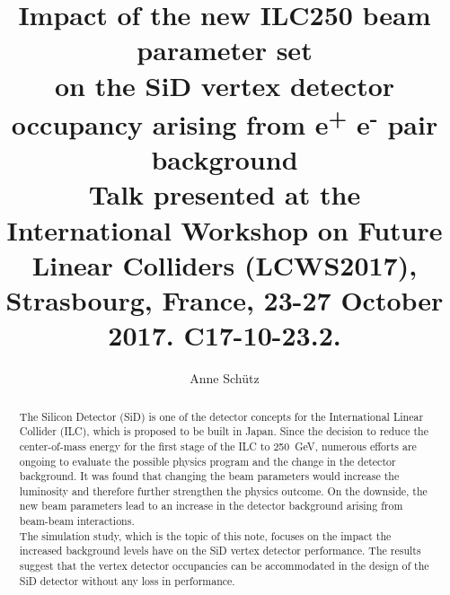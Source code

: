 \documentclass[12pt]{article}
\newcommand{\sid}{SiD\xspace}
\newcommand{\electron}{e\textsuperscript{-}\xspace}
\newcommand{\positron}{e\textsuperscript{+}\xspace}
\begin{document}

\title{Impact of the new ILC250 beam parameter set\\on the \sid vertex detector occupancy arising from \positron\electron pair background\vspace*{0.3cm}\\{\normalsize Talk presented at the\\\large International Workshop on Future Linear Colliders (LCWS2017), Strasbourg, France, 23-27 October 2017. C17-10-23.2.}}

\author[1,2]{Anne Sch\"utz}


\maketitle


\begin{abstract}
The Silicon Detector (SiD) is one of the detector concepts for the International Linear Collider (ILC), which is proposed to be built in Japan.
Since the decision to reduce the center-of-mass energy for the first stage of the ILC to \SI{250}{\GeV}, numerous efforts are ongoing to evaluate the possible physics program and the change in the detector background.
It was found that changing the beam parameters would increase the luminosity and therefore further strengthen the physics outcome.
On the downside, the new beam parameters lead to an increase in the detector background arising from beam-beam interactions.
\\
The simulation study, which is the topic of this note, focuses on the impact the increased background levels have on the SiD vertex detector performance.
The results suggest that the vertex detector occupancies can be accommodated in the design of the SiD detector without any loss in performance.
\end{abstract}


\end{document}
